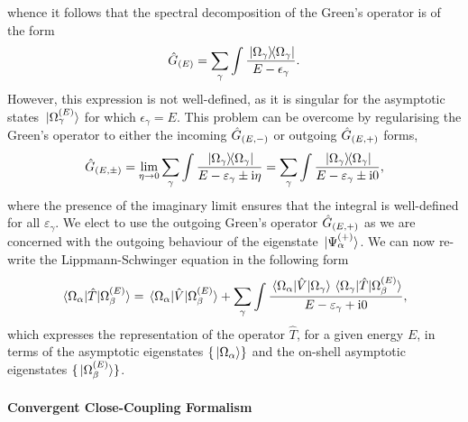 \documentclass[draft]{article}
\begin{document}
whence it follows that the spectral decomposition of the Green's operator is of
the form
\begin{equation}
  \label{eq:greens-operator-spectral}
  \hat{G}_{(E)}
  =
  \sum_{\gamma}\int
  \dfrac
  {
    \ketbra*{\Omega_{\gamma}}{\Omega_{\gamma}}
  }
  {
    E
    -
    \epsilon_{\gamma}
  }
  .
\end{equation}
However, this expression is not well-defined, as it is singular for the
asymptotic states $\ket*{\Omega_{\gamma}^{(E)}}$ for which
$\epsilon_{\gamma} = E$.
This problem can be overcome by regularising the Green's operator to either the
incoming $\hat{G}_{(E, -)}$ or outgoing $\hat{G}_{(E, +)}$ forms,
\begin{equation}
  \label{eq:greens-operator-regularise}
  \hat{G}_{(E, \pm)}
  =
  \lim_{\eta \to 0}
  \sum_{\gamma}\int
  \dfrac
  {
    \ketbra*{\Omega_{\gamma}}{\Omega_{\gamma}}
  }
  {
    E - \varepsilon_{\gamma} \pm \mathrm{i}\eta
  }
  =
  \sum_{\gamma}\int
  \dfrac
  {
    \ketbra*{\Omega_{\gamma}}{\Omega_{\gamma}}
  }
  {
    E - \varepsilon_{\gamma} \pm \mathrm{i} 0
  }
  ,
\end{equation}
where the presence of the imaginary limit ensures that the integral is
well-defined for all $\varepsilon_{\gamma}$.
We elect to use the outgoing Green's operator $\hat{G}_{(E, +)}$ as we are
concerned with the outgoing behaviour of the eigenstate
$\ket*{\Psi_{\alpha}^{(+)}}$.
We can now re-write the Lippmann-Schwinger equation in the following form
\begin{equation}
  \label{eq:ls-t}
  \mel*
  {\Omega_{\alpha}}
  {\hat{T}}
  {\Omega_{\beta}^{(E)}}
  =
  \mel*
  {\Omega_{\alpha}}
  {\hat{V} }
  {\Omega_{\beta}^{(E)}}
  +
  \sum_{\gamma}\int
  \dfrac
  {
    \mel*
    {\Omega_{\alpha}}
    {\hat{V}}
    {\Omega_{\gamma}}
    \mel*
    {\Omega_{\gamma}}
    {\hat{T}}
    {\Omega_{\beta}^{(E)}}
  }
  {
    E - \varepsilon_{\gamma} + \mathrm{i} 0
  }
  ,
\end{equation}
which expresses the representation of the operator $\hat{T}$, for a given energy
$E$, in terms of the asymptotic eigenstates $\lbrace\ket*{\Omega_{\alpha}}\rbrace$ and
the on-shell asymptotic eigenstates $\lbrace\ket*{\Omega_{\beta}^{(E)}}\rbrace$.


\paragraph{Convergent Close-Coupling Formalism}
\label{sec:ccc-formalism}
\end{document}

